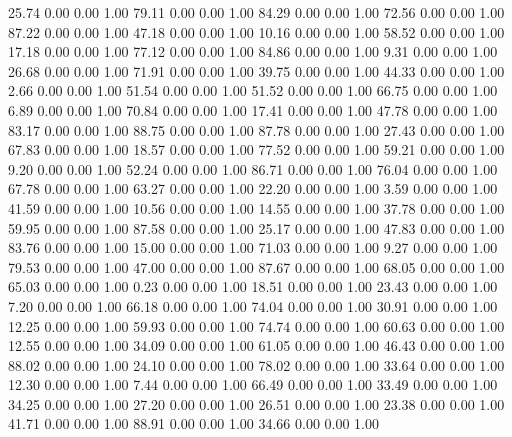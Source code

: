    25.74   0.00   0.00   1.00
   79.11   0.00   0.00   1.00
   84.29   0.00   0.00   1.00
   72.56   0.00   0.00   1.00
   87.22   0.00   0.00   1.00
   47.18   0.00   0.00   1.00
   10.16   0.00   0.00   1.00
   58.52   0.00   0.00   1.00
   17.18   0.00   0.00   1.00
   77.12   0.00   0.00   1.00
   84.86   0.00   0.00   1.00
    9.31   0.00   0.00   1.00
   26.68   0.00   0.00   1.00
   71.91   0.00   0.00   1.00
   39.75   0.00   0.00   1.00
   44.33   0.00   0.00   1.00
    2.66   0.00   0.00   1.00
   51.54   0.00   0.00   1.00
   51.52   0.00   0.00   1.00
   66.75   0.00   0.00   1.00
    6.89   0.00   0.00   1.00
   70.84   0.00   0.00   1.00
   17.41   0.00   0.00   1.00
   47.78   0.00   0.00   1.00
   83.17   0.00   0.00   1.00
   88.75   0.00   0.00   1.00
   87.78   0.00   0.00   1.00
   27.43   0.00   0.00   1.00
   67.83   0.00   0.00   1.00
   18.57   0.00   0.00   1.00
   77.52   0.00   0.00   1.00
   59.21   0.00   0.00   1.00
    9.20   0.00   0.00   1.00
   52.24   0.00   0.00   1.00
   86.71   0.00   0.00   1.00
   76.04   0.00   0.00   1.00
   67.78   0.00   0.00   1.00
   63.27   0.00   0.00   1.00
   22.20   0.00   0.00   1.00
    3.59   0.00   0.00   1.00
   41.59   0.00   0.00   1.00
   10.56   0.00   0.00   1.00
   14.55   0.00   0.00   1.00
   37.78   0.00   0.00   1.00
   59.95   0.00   0.00   1.00
   87.58   0.00   0.00   1.00
   25.17   0.00   0.00   1.00
   47.83   0.00   0.00   1.00
   83.76   0.00   0.00   1.00
   15.00   0.00   0.00   1.00
   71.03   0.00   0.00   1.00
    9.27   0.00   0.00   1.00
   79.53   0.00   0.00   1.00
   47.00   0.00   0.00   1.00
   87.67   0.00   0.00   1.00
   68.05   0.00   0.00   1.00
   65.03   0.00   0.00   1.00
    0.23   0.00   0.00   1.00
   18.51   0.00   0.00   1.00
   23.43   0.00   0.00   1.00
    7.20   0.00   0.00   1.00
   66.18   0.00   0.00   1.00
   74.04   0.00   0.00   1.00
   30.91   0.00   0.00   1.00
   12.25   0.00   0.00   1.00
   59.93   0.00   0.00   1.00
   74.74   0.00   0.00   1.00
   60.63   0.00   0.00   1.00
   12.55   0.00   0.00   1.00
   34.09   0.00   0.00   1.00
   61.05   0.00   0.00   1.00
   46.43   0.00   0.00   1.00
   88.02   0.00   0.00   1.00
   24.10   0.00   0.00   1.00
   78.02   0.00   0.00   1.00
   33.64   0.00   0.00   1.00
   12.30   0.00   0.00   1.00
    7.44   0.00   0.00   1.00
   66.49   0.00   0.00   1.00
   33.49   0.00   0.00   1.00
   34.25   0.00   0.00   1.00
   27.20   0.00   0.00   1.00
   26.51   0.00   0.00   1.00
   23.38   0.00   0.00   1.00
   41.71   0.00   0.00   1.00
   88.91   0.00   0.00   1.00
   34.66   0.00   0.00   1.00

